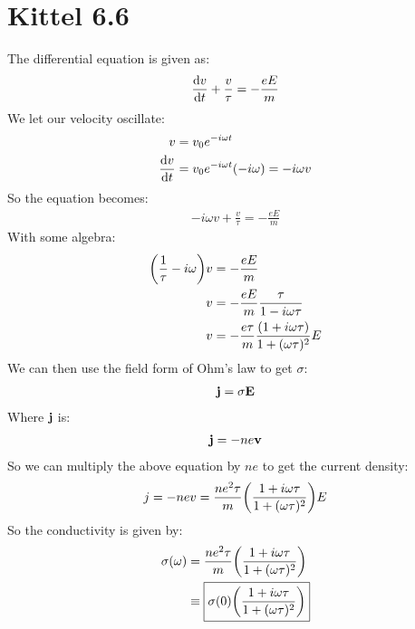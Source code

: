 \documentclass[12pt]{article}
\begin{document}
\section*{Kittel 6.6}
The differential equation is given as:
\begin{align*}
  \dv{v}{t}+\frac{v}{\tau}=-\frac{eE}{m}
\end{align*}
We let our velocity oscillate:
\begin{align*}
  v&=v_0e^{-i\omega t}\\
  \dv{v}{t}&=v_0e^{-i\omega t}(-i\omega)=-i\omega v
\end{align*}
So the equation becomes:
\begin{align*}
  -i\omega v +\frac{v}{\tau}=-\frac{eE}{m}
\end{align*}
With some algebra:
\begin{align*}
  \qty(\frac{1}{\tau}-i\omega)v&=-\frac{eE}{m}\\
  v&=-\frac{eE}{m}\frac{\tau}{1-i\omega\tau}\\
  v&=-\frac{e\tau}{m}\frac{\qty(1+i\omega\tau)}{1+(\omega\tau)^2}E\\
\end{align*}
We can then use the field form of Ohm's law to get $\sigma$:
\begin{align*}
  \vb{j}=\sigma \vb{E}
\end{align*}
Where $\vb{j}$ is:
\begin{align*}
  \vb{j}=-ne\vb{v}
\end{align*}
So we can multiply the above equation by $ne$ to get the current density:
\begin{align*}
  j=-nev=\frac{ne^2\tau}{m}\qty(\frac{1+i\omega\tau}{1+(\omega\tau)^2})E
\end{align*}
So the conductivity is given by:
\begin{align*}
  \sigma(\omega)&=\frac{ne^2\tau}{m}\qty(\frac{1+i\omega\tau}{1+(\omega\tau)^2})\\
  &\equiv\boxed{\sigma(0)\qty(\frac{1+i\omega\tau}{1+(\omega\tau)^2})}
\end{align*}
\end{document}
